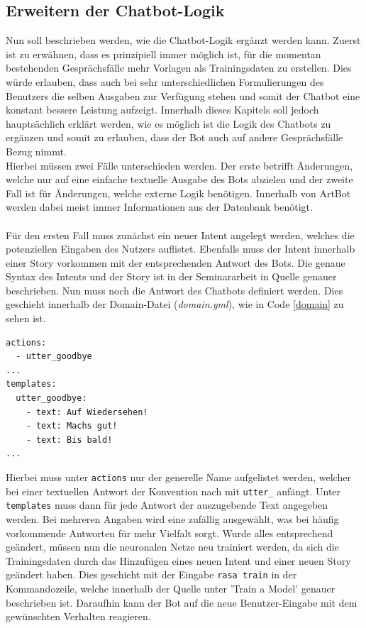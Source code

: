\subsection{Erweitern der Chatbot-Logik}\label{sec:logik}
Nun soll beschrieben werden, wie die Chatbot-Logik ergänzt werden kann. Zuerst ist zu erwähnen, dass es prinzipiell immer möglich ist, für die momentan bestehenden Gesprächsfälle mehr Vorlagen als Trainingsdaten zu erstellen. Dies würde erlauben, dass auch bei sehr unterschiedlichen Formulierungen des Benutzers die selben Ausgaben zur Verfügung stehen und somit der Chatbot eine konstant bessere Leistung aufzeigt. Innerhalb dieses Kapitels soll jedoch hauptsächlich erklärt werden, wie es möglich ist die Logik des Chatbots zu ergänzen und somit zu erlauben, dass der Bot auch auf andere Gesprächsfälle Bezug nimmt.\\
Hierbei müssen zwei Fälle unterschieden werden. Der erste betrifft Änderungen, welche nur auf eine einfache textuelle Ausgabe des Bots abzielen und der zweite Fall ist für Änderungen, welche externe Logik benötigen. Innerhalb von ArtBot werden dabei meist immer Informationen aus der Datenbank benötigt.\\
\\
Für den ersten Fall muss zunächst ein neuer Intent angelegt werden, welches die potenziellen Eingaben des Nutzers auflistet. Ebenfalls muss der Intent innerhalb einer Story vorkommen mit der entsprechenden Antwort des Bots. Die genaue Syntax des Intents und der Story ist in der Seminararbeit in Quelle \cite[S.10]{seminar} genauer beschrieben. Nun muss noch die Antwort des Chatbots definiert werden. Dies geschieht innerhalb der Domain-Datei (\textit{domain.yml}), wie in Code \ref{domain} zu sehen ist.
\begin{lstlisting}[caption={Einfügen einer neuen Antwort des Chatbots.}, label=domain, lineskip=1pt,
morekeywords={actions, templates, text}]
actions:
  - utter_goodbye
...
templates:
  utter_goodbye:
    - text: Auf Wiedersehen!
    - text: Machs gut!
    - text: Bis bald!
...
\end{lstlisting}
Hierbei muss unter \texttt{actions} nur der generelle Name aufgelistet werden, welcher bei einer textuellen Antwort der Konvention nach mit \texttt{utter\_} anfängt. Unter \texttt{templates} muss dann für jede Antwort der auszugebende Text angegeben werden. Bei mehreren Angaben wird eine zufällig ausgewählt, was bei häufig vorkommende Antworten für mehr Vielfalt sorgt. Wurde alles entsprechend geändert, müssen nun die neuronalen Netze neu trainiert werden, da sich die Trainingsdaten durch das Hinzufügen eines neuen Intent und einer neuen Story geändert haben. Dies geschieht mit der Eingabe \texttt{rasa train} in der Kommandozeile, welche innerhalb der Quelle \cite{command} unter 'Train a Model' genauer beschrieben ist. Daraufhin kann der Bot auf die neue Benutzer-Eingabe mit dem gewünschten Verhalten reagieren.\\
